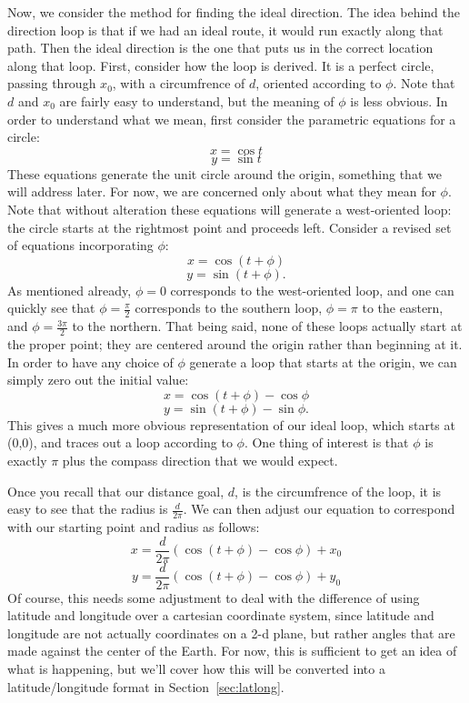 \documentclass[twocolumn,11pt]{article}
\begin{document}
Now, we consider the method for finding the ideal direction. The idea behind the
direction loop is that if we had an ideal route, it would run exactly along that
path. Then the ideal direction is the one that puts us in the correct location
along that loop. First, consider how the loop is derived. It is a perfect
circle, passing through $x_0$, with a circumfrence of $d$, oriented according to
$\phi$. Note that $d$ and $x_0$ are fairly easy to understand, but the meaning
 of $\phi$ is less obvious. In order to understand what we mean, first consider
the parametric equations for a circle:
\[ x = \cos t \]
\[ y = \sin t \]
These equations generate the unit circle around the origin, something that we
will address later. For now, we are concerned only about what they mean for
$\phi$. Note that without alteration these equations will generate a
west-oriented loop: the circle starts at the rightmost point and proceeds left.
Consider a revised set of equations incorporating $\phi$:
\[ x = \cos (t + \phi) \]
\[ y = \sin (t + \phi). \]
As mentioned already, $\phi = 0$ corresponds to the west-oriented loop, and one
can quickly see that $\phi = \frac{\pi}{2}$ corresponds to the southern loop,
$\phi = \pi$ to the eastern, and $\phi = \frac{3\pi}{2}$ to the northern. That
being said, none of these loops actually start at the proper point; they are
centered around the origin rather than beginning at it. In order to have any
choice of $\phi$ generate a loop that starts at the origin, we can simply zero
out the initial value:
\[ x = \cos (t + \phi) - \cos \phi \]
\[ y = \sin ( t + \phi ) - \sin \phi. \]
This gives a much more obvious representation of our ideal loop, which starts
at (0,0), and traces out a loop according to $\phi$. One thing of interest is
that $\phi$ is exactly $\pi$ plus the compass direction that we would expect.

Once you recall that our distance goal, $d$, is the circumfrence of the loop,
it is easy to see that the radius is $\frac{d}{2\pi}$. We can then adjust our
equation to correspond with our starting point and radius as follows:
\[ x = \frac{d}{2\pi}(\cos ( t + \phi ) - \cos \phi ) + x_0 \]
\[ y = \frac{d}{2\pi}(\cos ( t + \phi ) - \cos \phi ) + y_0 \]
Of course, this needs some adjustment to deal with the difference of using
latitude and longitude over a cartesian coordinate system, since latitude
and longitude are not actually coordinates on a 2-d plane, but rather angles
that are made against the center of the Earth. For now, this is sufficient to
get an idea of what is happening, but we'll cover how this will be converted
into a latitude/longitude format in Section~\ref{sec:latlong}.
\end{document}
